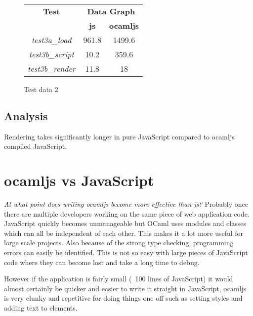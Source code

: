 \begin{figure}
  \begin{tabular}{|c|c|c|}
    \hline
    \textbf{Test} & \multicolumn{2}{|c|}{\textbf{Data Graph}} \\
    \cline{2-3}
    & \textbf{js} & \textbf{ocamljs} \\
    \hline
    \emph{test3a\_load} & 961.8 & 1499.6 \\
    \hline
    \emph{test3b\_script} & 10.2 & 359.6 \\
    \hline
    \emph{test3b\_render} & 11.8 & 18 \\
    \hline
  \end{tabular}
  \caption{Test data 2}
  \label{test_data2}
\end{figure}

\subsection{Analysis}
Rendering takes significantly longer in pure JavaScript compared to ocamljs compiled JavaScript.

\section{ocamljs vs JavaScript}
\emph{At what point does writing ocamljs become more effective than js?} Probably once there are multiple developers working on the same piece of web application code. JavaScript quickly becomes unmanageable but OCaml uses modules and classes which can all be independent of each other. This makes it a lot more useful for large scale projects. Also because of the strong type checking, programming errors can easily be identified. This is not so easy with large pieces of JavaScript code where they can become lost and take a long time to debug.

However if the application is fairly small (~100 lines of JavaScript) it would almost certainly be quicker and easier to write it straight in JavaScript, ocamljs is very clunky and repetitive for doing things one off such as setting styles and adding text to elements.



